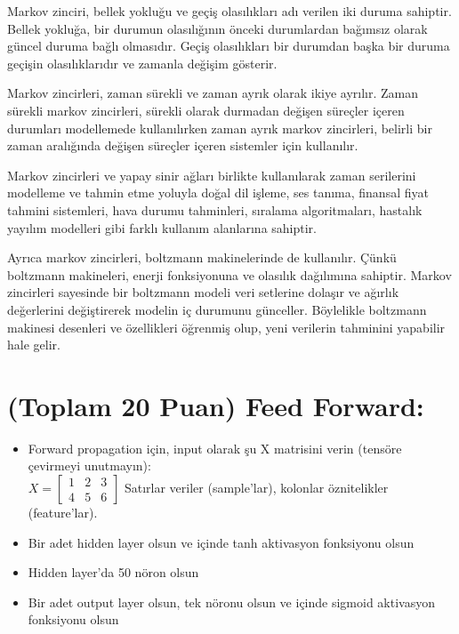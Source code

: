 \documentclass[11pt]{article}
\begin{document}
Markov zinciri, bellek yokluğu ve geçiş olasılıkları adı verilen iki duruma sahiptir. Bellek yokluğa, bir durumun olasılığının önceki durumlardan bağımsız olarak güncel duruma bağlı olmasıdır. Geçiş olasılıkları bir durumdan başka bir duruma geçişin olasılıklarıdır ve zamanla  değişim gösterir.

Markov zincirleri, zaman sürekli ve zaman ayrık olarak ikiye ayrılır. Zaman sürekli markov zincirleri, sürekli olarak durmadan değişen süreçler içeren durumları modellemede kullanılırken zaman ayrık markov zincirleri, belirli bir zaman aralığında değişen süreçler içeren sistemler için kullanılır.

Markov zincirleri ve yapay sinir ağları birlikte kullanılarak zaman serilerini modelleme ve tahmin etme yoluyla doğal dil işleme, ses tanıma, finansal fiyat tahmini sistemleri, hava durumu tahminleri, sıralama algoritmaları, hastalık yayılım modelleri gibi farklı kullanım alanlarına sahiptir.

Ayrıca markov zincirleri, boltzmann  makinelerinde de kullanılır. Çünkü boltzmann makineleri, enerji fonksiyonuna ve olasılık dağılımına sahiptir. Markov zincirleri sayesinde bir boltzmann modeli veri setlerine dolaşır ve ağırlık değerlerini değiştirerek modelin iç durumunu günceller. Böylelikle boltzmann makinesi desenleri ve özellikleri öğrenmiş olup, yeni verilerin tahminini yapabilir hale gelir.


\section{(Toplam 20 Puan) Feed Forward:}
 
\begin{itemize}
    \item Forward propagation için, input olarak şu X matrisini verin (tensöre çevirmeyi unutmayın):\\
    $X = \begin{bmatrix}
        1 & 2 & 3\\
        4 & 5 & 6
        \end{bmatrix}$
    Satırlar veriler (sample'lar), kolonlar öznitelikler (feature'lar).
    \item Bir adet hidden layer olsun ve içinde tanh aktivasyon fonksiyonu olsun
    \item Hidden layer'da 50 nöron olsun
    \item Bir adet output layer olsun, tek nöronu olsun ve içinde sigmoid aktivasyon fonksiyonu olsun
\end{itemize}
\end{document}

